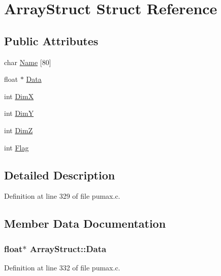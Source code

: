 \hypertarget{struct_array_struct}{
\section{\-Array\-Struct \-Struct \-Reference}
\label{struct_array_struct}
}
\subsection*{\-Public \-Attributes}
\begin{DoxyCompactItemize}
\item 
char \hyperlink{struct_array_struct_ae5bd936d5280e2021bdd3b61f51c31d4}{\-Name} \mbox{[}80\mbox{]}
\item 
float $\ast$ \hyperlink{struct_array_struct_a38c55a484b3d01e2ffa11f14de2adfd9}{\-Data}
\item 
int \hyperlink{struct_array_struct_a51fc8e81440a7098077d179fca8d63b8}{\-Dim\-X}
\item 
int \hyperlink{struct_array_struct_a73fc2a83ee5c78d73b0f4389a0771afb}{\-Dim\-Y}
\item 
int \hyperlink{struct_array_struct_a53f6572c6d936b07f27d8d6fb9acb915}{\-Dim\-Z}
\item 
int \hyperlink{struct_array_struct_a00b2e20e7e3b5c5f3cf3e9e6cee16ca3}{\-Flag}
\end{DoxyCompactItemize}


\subsection{\-Detailed \-Description}


\-Definition at line 329 of file pumax.\-c.



\subsection{\-Member \-Data \-Documentation}
\hypertarget{struct_array_struct_a38c55a484b3d01e2ffa11f14de2adfd9}{
\subsubsection[{\-Data}]{\setlength{\rightskip}{0pt plus 5cm}float$\ast$ {\bf \-Array\-Struct\-::\-Data}}}
\label{struct_array_struct_a38c55a484b3d01e2ffa11f14de2adfd9}


\-Definition at line 332 of file pumax.\-c.

